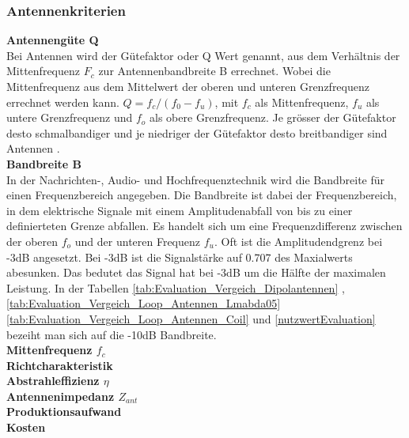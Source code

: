 \subsubsection{Antennenkriterien}
\textbf{Antennengüte Q}\\
Bei Antennen wird der Gütefaktor oder Q Wert genannt, aus dem Verhältnis der Mittenfrequenz $F_{c}$ zur Antennenbandbreite B errechnet. Wobei die Mittenfrequenz aus dem Mittelwert der oberen und unteren Grenzfrequenz errechnet werden kann. $Q = f_c/(f_0-f_u)$, mit $f_c$ als Mittenfrequenz, $f_u$ als untere Grenzfrequenz und $f_o$ als obere Grenzfrequenz. Je grösser der Gütefaktor desto schmalbandiger und je niedriger der Gütefaktor  desto breitbandiger sind Antennen \cite{Gütefaktor_Q}.\\
\textbf{Bandbreite B}\\
In der Nachrichten-, Audio- und Hochfrequenztechnik wird die Bandbreite für einen Frequenzbereich angegeben. Die Bandbreite ist dabei der Frequenzbereich, in dem elektrische Signale mit einem Amplitudenabfall von bis zu einer definierteten Grenze abfallen. Es handelt sich um eine Frequenzdifferenz zwischen der oberen $f_o$ und der unteren Frequenz $f_u$. Oft ist die Amplitudendgrenz bei -3dB angesetzt. Bei -3dB ist die Signalstärke auf 0.707 des Maxialwerts abesunken. Das bedutet das Signal hat bei -3dB um die Hälfte der maximalen Leistung.
In der Tabellen \ref{tab:Evaluation_Vergeich_Dipolantennen} ,\ref{tab:Evaluation_Vergeich_Loop_Antennen_Lmabda05}\ref{tab:Evaluation_Vergeich_Loop_Antennen_Coil} und \ref{nutzwertEvaluation} bezeiht man sich auf die -10dB Bandbreite.\\
\textbf{Mittenfrequenz $f_{c}$}\\
\textbf{Richtcharakteristik}\\
\textbf{Abstrahleffizienz $\eta$}\\
\textbf{Antennenimpedanz $Z_{ant}$}\\
\textbf{Produktionsaufwand}\\
\textbf{Kosten}\\
\newpage 
\thispagestyle{empty}

